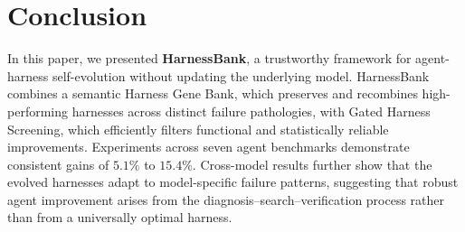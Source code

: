 \section{Conclusion}

In this paper, we presented \textbf{HarnessBank}, a trustworthy framework for agent-harness self-evolution without updating the underlying model. HarnessBank combines a semantic Harness Gene Bank, which preserves and recombines high-performing harnesses across distinct failure pathologies, with Gated Harness Screening, which efficiently filters functional and statistically reliable improvements. Experiments across seven agent benchmarks demonstrate consistent gains of $5.1\%$ to $15.4\%$. Cross-model results further show that the evolved harnesses adapt to model-specific failure patterns, suggesting that robust agent improvement arises from the diagnosis--search--verification process rather than from a universally optimal harness.
